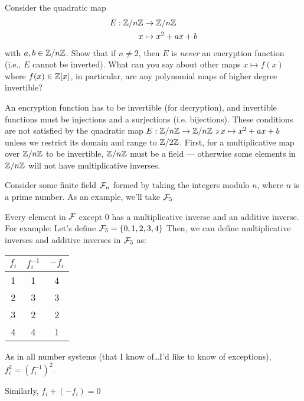
\begin{problem}
Consider the quadratic map
\begin{align*}
E:\mathbb{Z}/n\mathbb{Z} &\to \mathbb{Z}/n\mathbb{Z} \\
x &\mapsto x^2+ax+b
\end{align*}
with $a,b \in \mathbb{Z}/n\mathbb{Z}$.  Show that if $n \neq 2$, then $E$ is
\emph{never} an encryption function (i.e., $E$ cannot be inverted).
What can you say about other maps $x \mapsto f(x)$ where $f(x) \in
\mathbb{Z}[x]$, in particular, are any polynomial maps of higher degree invertible?
\end{problem}
\begin{Answer}
An encryption function has to be invertible (for decryption),
and invertible functions must be injections and a surjections (i.e. bijections).
These conditions are not satisfied by the quadratic map
$E:\mathbb{Z}/n\mathbb{Z} \to \mathbb{Z}/n\mathbb{Z} \backepsilon x \mapsto x^2+ax+b$
unless we restrict its domain and range to $\mathbb{Z}/2\mathbb{Z}$.
First, for a multiplicative map over $\mathbb{Z}/n\mathbb{Z}$ to be invertible, $\mathbb{Z}/n\mathbb{Z}$ must be a field --- otherwise some elements
in $\mathbb{Z}/n\mathbb{Z}$ will not have multiplicative inverses.

\noindent
Consider some finite field $\mathcal{F}_n$ formed by taking the integers modulo $n$, where $n$ is a prime number.
As an example, we'll take $\mathcal{F}_5$

\noindent
Every element in $\mathcal{F}$ except $0$ has a multiplicative inverse and an additive inverse.
For example:
\noindent
Let's define $\mathcal{F}_5 = \{0,1,2,3,4\}$
\noindent
Then, we can define multiplicative inverses and additive inverses in $\mathcal{F}_5$ as:

\centering
\begin{tabular}{||c | c | c||} 
  \hline
  $f_i$ & $f_i^{-1}$ & $-f_i$\\ [0.5ex] 
  \hline\hline
  1 & 1 & 4\\ 
  2 & 3 & 3\\
  3 & 2 & 2\\
  4 & 4 & 1\\[1ex] 
  \hline
\end{tabular}
\label{table:1}

\justifying
\noindent
As in all number systems (that I know of\ldots I'd like to know of exceptions),
$f_i^{2} = (f_i^{-1})^{2}$.

\noindent
Similarly, $f_i + (-f_i) = 0$


\end{Answer}
